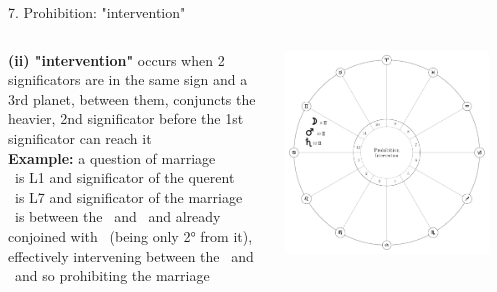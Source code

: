 \begin{frame}[t]{7. Prohibition: "intervention"}
\begin{columns}[T, onlytextwidth]
\vspace{0.5cm}
\textbf{(ii) "intervention"} occurs when 2 significators are in the same sign and a 3rd planet, between them, conjuncts the heavier, 2nd significator before the 1st significator can reach it \\

\vspace{0.25cm}
\textbf{Example:} a question of marriage \\
\ul
\Moon\ is L1 and significator of the querent \\
\Saturn\ is L7 and significator of the marriage \\

\vspace{0.25cm}
\Mars\ is between the \Moon\ and \Saturn\ and already conjoined with \Saturn\ (being only 2° from it), effectively intervening between the \Moon\ and \Saturn\ and so prohibiting the  marriage
	
\begin{center}
{\includegraphics[width=0.9\textwidth]{charts/63-intervention}} \\
\end{center}
\end{columns}
\end{frame}

